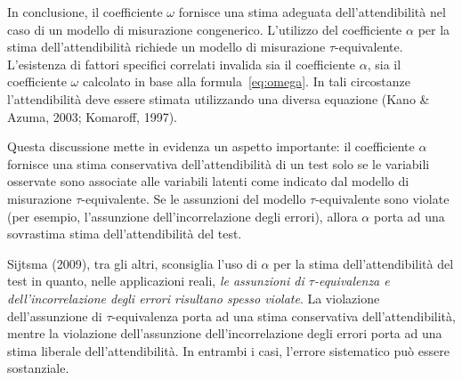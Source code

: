 In conclusione, il coefficiente $\omega$ fornisce una stima adeguata dell'attendibilità nel caso di un modello di misurazione congenerico. 
L'utilizzo del coefficiente $\alpha$ per la stima dell'attendibilità richiede un modello di misurazione $\tau$-equivalente.
L'esistenza di fattori specifici correlati invalida sia il coefficiente $\alpha$, sia il coefficiente $\omega$ calcolato in base alla formula~\ref{eq:omega}. 
In tali circostanze l'attendibilità deve essere stimata utilizzando una diversa equazione (Kano \& Azuma, 2003; Komaroff, 1997).

Questa discussione mette in evidenza un aspetto importante: il coefficiente $\alpha$ fornisce una stima conservativa dell'attendibilità di un test solo se le variabili osservate sono associate alle variabili latenti come indicato dal modello di misurazione $\tau$-equivalente.
Se le assunzioni del modello $\tau$-equivalente sono violate (per esempio, l'assunzione dell'incorrelazione degli errori), allora $\alpha$ porta ad una sovrastima stima  dell'attendibilità del test.  

Sijtsma (2009), tra gli altri, sconsiglia
  l'uso di $\alpha$ per la stima dell'attendibilità del test in
  quanto, nelle applicazioni reali, \textit{le assunzioni di
  $\tau$-equivalenza e dell'incorrelazione degli errori risultano
  spesso violate}. 
 La violazione dell'assunzione di $\tau$-equivalenza porta ad una
  stima conservativa dell'attendibilità, mentre la violazione
  dell'assunzione dell'incorrelazione degli errori porta ad una stima
  liberale dell'attendibilità. 
 In entrambi i casi, l'errore sistematico può essere sostanziale.


